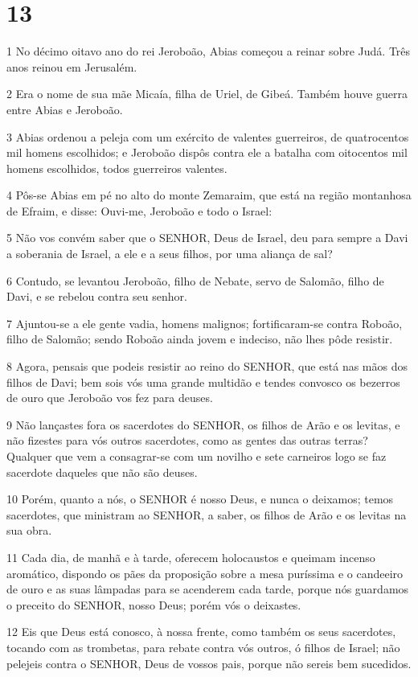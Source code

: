 \chapter{13}

\par 1 No décimo oitavo ano do rei Jeroboão, Abias começou a reinar sobre Judá. Três anos reinou em Jerusalém.
\par 2 Era o nome de sua mãe Micaía, filha de Uriel, de Gibeá. Também houve guerra entre Abias e Jeroboão.
\par 3 Abias ordenou a peleja com um exército de valentes guerreiros, de quatrocentos mil homens escolhidos; e Jeroboão dispôs contra ele a batalha com oitocentos mil homens escolhidos, todos guerreiros valentes.
\par 4 Pôs-se Abias em pé no alto do monte Zemaraim, que está na região montanhosa de Efraim, e disse: Ouvi-me, Jeroboão e todo o Israel:
\par 5 Não vos convém saber que o SENHOR, Deus de Israel, deu para sempre a Davi a soberania de Israel, a ele e a seus filhos, por uma aliança de sal?
\par 6 Contudo, se levantou Jeroboão, filho de Nebate, servo de Salomão, filho de Davi, e se rebelou contra seu senhor.
\par 7 Ajuntou-se a ele gente vadia, homens malignos; fortificaram-se contra Roboão, filho de Salomão; sendo Roboão ainda jovem e indeciso, não lhes pôde resistir.
\par 8 Agora, pensais que podeis resistir ao reino do SENHOR, que está nas mãos dos filhos de Davi; bem sois vós uma grande multidão e tendes convosco os bezerros de ouro que Jeroboão vos fez para deuses.
\par 9 Não lançastes fora os sacerdotes do SENHOR, os filhos de Arão e os levitas, e não fizestes para vós outros sacerdotes, como as gentes das outras terras? Qualquer que vem a consagrar-se com um novilho e sete carneiros logo se faz sacerdote daqueles que não são deuses.
\par 10 Porém, quanto a nós, o SENHOR é nosso Deus, e nunca o deixamos; temos sacerdotes, que ministram ao SENHOR, a saber, os filhos de Arão e os levitas na sua obra.
\par 11 Cada dia, de manhã e à tarde, oferecem holocaustos e queimam incenso aromático, dispondo os pães da proposição sobre a mesa puríssima e o candeeiro de ouro e as suas lâmpadas para se acenderem cada tarde, porque nós guardamos o preceito do SENHOR, nosso Deus; porém vós o deixastes.
\par 12 Eis que Deus está conosco, à nossa frente, como também os seus sacerdotes, tocando com as trombetas, para rebate contra vós outros, ó filhos de Israel; não pelejeis contra o SENHOR, Deus de vossos pais, porque não sereis bem sucedidos.

